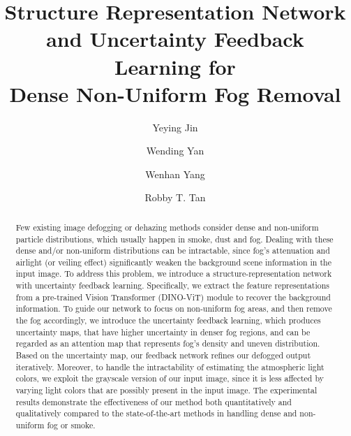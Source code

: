 \documentclass[runningheads]{llncs}
\begin{document}
\pagestyle{headings}
\mainmatter

\def\ACCV22SubNumber{393}  

\title{Structure Representation Network and Uncertainty Feedback Learning for \\Dense Non-Uniform Fog Removal} 

\author{Yeying Jin \and
	Wending Yan \and
	Wenhan Yang \and
	Robby T. Tan}

\def\thefootnote{$\dagger$}\def\thefootnote{\arabic{footnote}}

\maketitle

\begin{abstract}
Few existing image defogging or dehazing methods consider dense and non-uniform particle distributions, which usually happen in smoke, dust and fog.
Dealing with these dense and/or non-uniform distributions can be intractable, since fog's attenuation and airlight (or veiling effect) significantly weaken the background scene information in the input image.
To address this problem, we introduce a structure-representation network with uncertainty feedback learning.
Specifically, we extract the feature representations from a  pre-trained Vision Transformer (DINO-ViT) module to recover the background information.
To guide our network to focus on non-uniform fog areas, and then remove the fog accordingly, we introduce the uncertainty feedback learning, which produces uncertainty maps, that have higher uncertainty in denser fog regions, and can be regarded as an attention map that represents fog's density and uneven distribution.
Based on the uncertainty map, our feedback network refines our defogged output iteratively.
Moreover, to handle the intractability of estimating the atmospheric light colors, we exploit the grayscale version of our input image, since it is less affected by varying light colors that are possibly present in the input image.
The experimental results demonstrate the effectiveness of our method both quantitatively and qualitatively compared to the state-of-the-art methods in handling dense and non-uniform fog or smoke.
\end{abstract}
\end{document}
